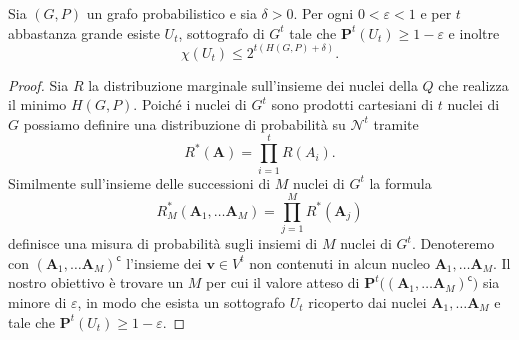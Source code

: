 \begin{theorem}
  [K\"orner] Sia \((G,P)\) un grafo probabilistico e sia \(\delta>0\). Per ogni \(0<\varepsilon<1\) e per \(t\) abbastanza grande esiste \(U_{t}\), sottografo di \(G^{t}\) tale che \(\mathbf{P}^t(U_{t})\ge 1-\varepsilon\) e inoltre
  \[\chi(U_{t})\le 2^{t(H(G,P)+\delta)}.\]
\end{theorem}
\begin{proof}
  Sia \(R\) la distribuzione marginale sull'insieme dei nuclei della \(Q\) che realizza il minimo \(H(G,P)\). Poiché i nuclei di \(G^t\) sono prodotti cartesiani di \(t\) nuclei di \(G\) possiamo definire una distribuzione di probabilità su \(\mathcal{N}^t\) tramite
  \[R^{*}(\mathbf{A}) = \prod_{i=1}^t R(A_{i}).\]
  Similmente sull'insieme delle successioni di \(M\) nuclei di \(G^t\) la formula
  \[R_{M}^{*}(\mathbf{A}_{1},\dots\mathbf{A}_{M}) = \prod_{j=1}^M R^{*}(\mathbf{A}_j)\]
  definisce una misura di probabilità sugli insiemi di \(M\) nuclei di \(G^t\). Denoteremo con \((\mathbf{A}_{1},\dots\mathbf{A}_{M})^{\mathsf{c}}\) l'insieme dei \(\mathbf{v}\in V^{t}\) non contenuti in alcun nucleo \(\mathbf{A}_{1},\dots\mathbf{A}_{M}\). Il nostro obiettivo è trovare un \(M\) per cui il valore atteso di \(\mathbf{P}^t\big((\mathbf{A}_{1},\dots\mathbf{A}_{M})^{\mathsf{c}}\big)\) sia minore di \(\varepsilon\), in modo che esista un sottografo \(U_{t}\) ricoperto dai nuclei \(\mathbf{A}_{1},\dots\mathbf{A}_{M}\) e tale che \(\mathbf{P}^t(U_{t})\ge 1-\varepsilon\).
	

\end{proof}
